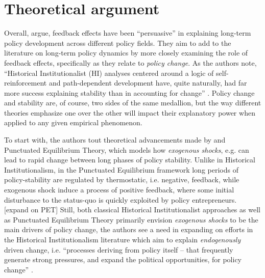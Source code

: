 \documentclass[11pt]{article}
\begin{document}
\section*{Theoretical argument}
Overall, \textcite[][]{Jacobs2014} argue, feedback effects have been \enquote{persuasive}  in explaining long-term policy development across different policy fields. They aim to add to the literature on long-term policy dynamics by more closely examining the role of feedback effects, specifically as they relate to \textit{policy change}. As the authors note, \enquote{Historical Institutionalist (HI) analyses centered around a logic of self-reinforcement and path-dependent development have, quite naturally, had far more success explaining stability than in accounting for change} \parencite[][p. 443]{Jacobs2014}. Policy change and stability are, of course, two sides of the same medallion, but the way different theories emphasize one over the other will impact their explanatory power when applied to any given empirical phenomenon.

To start with, the authors tout theoretical advancements made by \textcite[][]{Baumgartner2002} and Punctuated Equilibrium Theory, which models how \textit{exogenous shocks}, e.g. can lead to rapid change between long phases of policy stability. Unlike in Historical Institutionalism, in the Punctuated Equilibrium framework long periods of policy-stability are regulated by thermostatic, i.e. negative, feedback, while exogenous shock induce a process of positive feedback, where some initial disturbance to the status-quo is quickly exploited by policy entrepreneurs. {\color{red}[expand on PET]} Still, both classical Historical Institutionalist approaches as well as Punctuated Equilibrium Theory primarily envision \textit{exogenous shocks} to be the main drivers of policy change, the authors see a need in expanding on efforts in the Historical Institutionalism literature which aim to explain \textit{endogenously} driven change, i.e. \enquote{processes deriving from policy itself -- that frequently generate strong pressures, and expand the political opportunities, for policy change} \parencite[p. 442]{Jacobs2014}.
\end{document}
